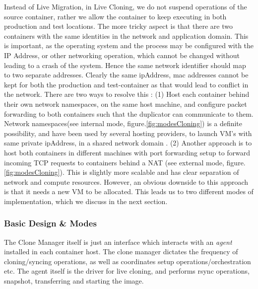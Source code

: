 Instead of Live Migration, in Live Cloning, we do not suspend operations of the source container, rather we allow the container to keep executing in both production and test locations.
The more tricky aspect is that there are two containers with the same identities in the network and application domain. 
This is important, as the operating system and the process may be configured with the IP Address, or other networking operation, which cannot be changed without leading to a crash of the system.
Hence the same network identifier should map to two separate addresses.
Clearly the same ipAddress, mac addresses cannot be kept for both the production and test-container as that would lead to conflict in the network. 
There are two ways to resolve this : 
(1) Host each container behind their own network namespaces, on the same host machine, and configure packet forwarding to both containers such that the duplicator can communicate to them. 
Network namespaces(see internal mode, figure.\ref{fig:modesCloning}) is a definite possibility, and have been used by several hosting providers, to launch VM's with same private ipAddress, in a shared network domain \cite{OpenStack}. 
(2) Another approach is to host both containers in different machines with port forwarding setup to forward incoming TCP requests to containers behind a NAT (see external mode, figure.\ref{fig:modesCloning}). 
This is slightly more scalable and has clear separation of network and compute resources. 
However, an obvious downside to this approach is that it needs a new VM to be allocated.
This leads us to two different modes of implementation, which we discuss in the next section.
%

\subsubsection{Basic Design \& Modes}

The Clone Manager itself is just an interface which interacts with an \textit{agent} installed in each container host.
The clone manager dictates the frequency of cloning/syncing operations, as well as  coordinates setup operations/orchestration etc.
The agent itself is the driver for live cloning, and performs rsync operations, snapshot, transferring and starting the image.

